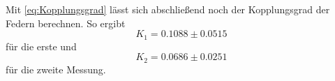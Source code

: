 Mit \eqref{eq:Kopplungsgrad} lässt sich abschließend noch der Kopplungsgrad der Federn berechnen.
So ergibt
\begin{equation}
  K_1 = 0.1088 \pm 0.0515 \nonumber
\end{equation} für die erste und
\begin{equation}
  K_2 = 0.0686 \pm 0.0251
\end{equation} für die zweite Messung.



